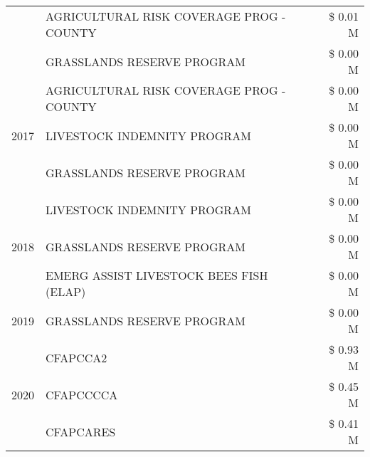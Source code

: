 \begin{tabular}{llr}
 & AGRICULTURAL RISK COVERAGE PROG - COUNTY & \$ 0.01 M \\
 & GRASSLANDS RESERVE PROGRAM & \$ 0.00 M \\
\cline{1-3}
\multirow[t]{3}{*}{2017} & AGRICULTURAL RISK COVERAGE PROG - COUNTY & \$ 0.00 M \\
 & LIVESTOCK INDEMNITY PROGRAM & \$ 0.00 M \\
 & GRASSLANDS RESERVE PROGRAM & \$ 0.00 M \\
\cline{1-3}
\multirow[t]{3}{*}{2018} & LIVESTOCK INDEMNITY PROGRAM & \$ 0.00 M \\
 & GRASSLANDS RESERVE PROGRAM & \$ 0.00 M \\
 & EMERG ASSIST LIVESTOCK BEES FISH (ELAP) & \$ 0.00 M \\
\cline{1-3}
2019 & GRASSLANDS RESERVE PROGRAM & \$ 0.00 M \\
\cline{1-3}
\multirow[t]{3}{*}{2020} & CFAPCCA2 & \$ 0.93 M \\
 & CFAPCCCCA & \$ 0.45 M \\
 & CFAPCARES & \$ 0.41 M \\
\cline{1-3}
\bottomrule
\end{tabular}
